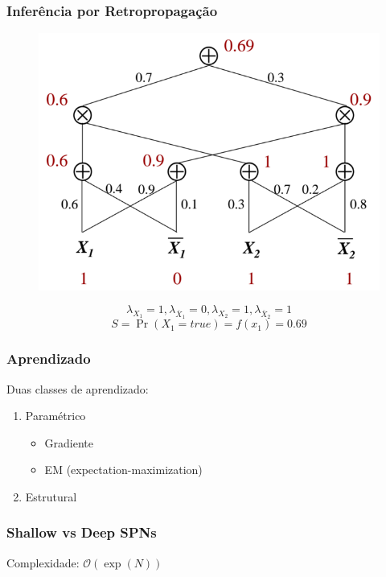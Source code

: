 \documentclass[10pt]{beamer}
\theoremstyle{plain}
\newcommand{\bigo}{\mathcal{O}}
\begin{document}
\begin{frame}
  \frametitle{Inferência por Retropropagação}

  \begin{figure}[h]
    \centering\includegraphics[scale=0.25]{imgs/marginals.png}
  \end{figure}
  \begin{equation*}
    \lambda_{X_1}=1,\lambda_{\overline{X}_1}=0,\lambda_{X_2}=1,\lambda_{\overline{X}_2}=1
  \end{equation*}
  \begin{equation*}
    S=\Pr(X_1=true)=f(x_1)=0.69
  \end{equation*}
\end{frame}

\begin{frame}
  \frametitle{Aprendizado}

  Duas classes de aprendizado:
  \begin{enumerate}
    \item Paramétrico~\cite{poon-domingos}
      \begin{itemize}
        \item Gradiente
        \item EM (expectation-maximization)
      \end{itemize}
    \item Estrutural~\cite{gens-domingos}
  \end{enumerate}
\end{frame}

\begin{frame}
  \frametitle{Shallow vs Deep SPNs}

  \begin{figure}[h]
  \end{figure}

  Complexidade: $\bigo(\exp(N))$
\end{frame}
\end{document}
